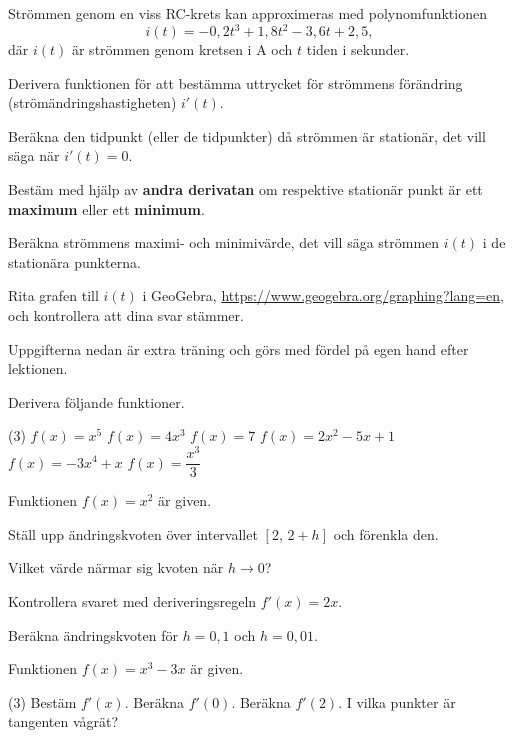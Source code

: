 Strömmen genom en viss RC-krets kan approximeras med polynomfunktionen
\[
  i(t) = -0{,}2t^3 + 1{,}8t^2 - 3{,}6t + 2{,}5,
\]
där $i(t)$ är strömmen genom kretsen i A och $t$ tiden i sekunder.
\begin{parts}
  \item Derivera funktionen för att bestämma uttrycket för strömmens förändring
    (strömändringshastigheten) $i'(t)$.
  \item Beräkna den tidpunkt (eller de tidpunkter) då strömmen är stationär, det vill säga när
    $i'(t) = 0$.
  \item Bestäm med hjälp av \textbf{andra derivatan} om respektive stationär punkt är ett
    \textbf{maximum} eller ett \textbf{minimum}.
  \item Beräkna strömmens maximi- och minimivärde, det vill säga strömmen $i(t)$ i de
    stationära punkterna.
  \item Rita grafen till $i(t)$ i GeoGebra, \url{https://www.geogebra.org/graphing?lang=en}, och
    kontrollera att dina svar stämmer.
\end{parts}

Uppgifterna nedan är extra träning och görs med fördel på egen hand efter lektionen.

Derivera följande funktioner.
\begin{delar}(3)
  \task $f(x) = x^5$
  \task $f(x) = 4x^3$
  \task $f(x) = 7$
  \task $f(x) = 2x^2 - 5x + 1$
  \task $f(x) = -3x^4 + x$
  \task $f(x) = \dfrac{x^3}{3}$
\end{delar}

Funktionen $f(x) = x^2$ är given.
\begin{parts}
  \item Ställ upp ändringskvoten över intervallet $[2,\, 2 + h]$ och förenkla den.
  \item Vilket värde närmar sig kvoten när $h \to 0$?
  \item Kontrollera svaret med deriveringsregeln $f'(x) = 2x$.
  \item Beräkna ändringskvoten för $h = 0{,}1$ och $h = 0{,}01$.
\end{parts}

Funktionen $f(x) = x^3 - 3x$ är given.
\begin{delar}(3)
  \task Bestäm $f'(x)$.
  \task Beräkna $f'(0)$.
  \task Beräkna $f'(2)$.
  \task* I vilka punkter är tangenten vågrät?
\end{delar}

